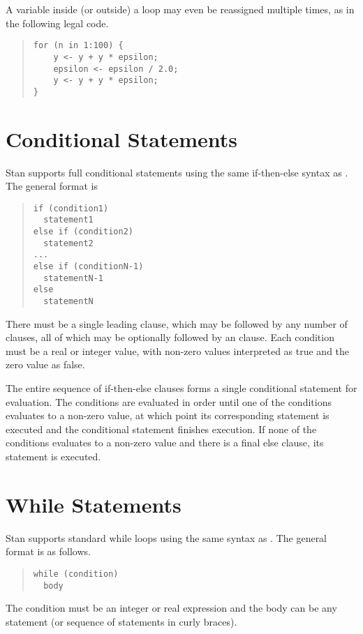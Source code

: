 A variable inside (or outside) a loop may even be reassigned multiple
times, as in the following legal code.
%
\begin{quote}
\begin{Verbatim}[fontsize=\small]
for (n in 1:100) {
    y <- y + y * epsilon;
    epsilon <- epsilon / 2.0;
    y <- y + y * epsilon;
}
\end{Verbatim}
\end{quote}

\section{Conditional Statements}

Stan supports full conditional statements using
the same if-then-else syntax as \Cpp.  The general format is
%
\begin{quote}
\begin{Verbatim}[fontsize=\small]
if (condition1)
  statement1
else if (condition2)
  statement2
...
else if (conditionN-1)
  statementN-1
else
  statementN
\end{Verbatim}
\end{quote}
%
There must be a single leading  clause, which may be followed
by any number of  clauses, all of which may be
optionally followed by an  clause.  Each condition must be
a real or integer value, with non-zero values interpreted as true and
the zero value as false.

The entire sequence of if-then-else clauses forms a single conditional
statement for evaluation.  The conditions are evaluated in order
until one of the conditions evaluates to a non-zero value, at which
point its corresponding statement is executed and the conditional
statement finishes execution.  If none of the conditions evaluates to
a non-zero value and there is a final else clause, its statement is
executed.  

\section{While Statements}

Stan supports standard while loops using the same syntax as \Cpp.  The
general format is as follows.
%
\begin{quote}
\begin{Verbatim}[fontsize=\small]
while (condition)
  body
\end{Verbatim}
\end{quote}
%
The condition must be an integer or real expression and the body can
be any statement (or sequence of statements in curly braces).  

